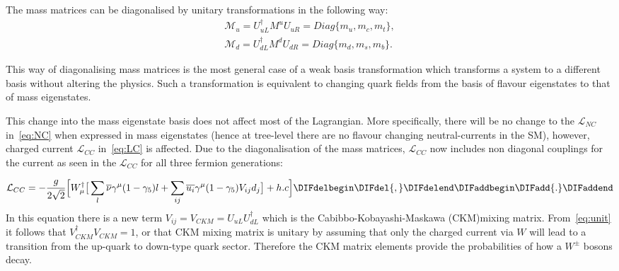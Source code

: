  \DIFaddend The mass matrices can be diagonalised by unitary transformations \DIFdelbegin {}\DIFdelend \DIFaddbegin {}\DIFaddend in the following way:
\begin{equation}
\begin{split}
	\mathcal{M}_{u} = U^{\dagger}_{uL}M^{u}U_{uR} = Diag\{m_{u},m_{c},m_{t}\},
\\
	\mathcal{M}_{d} = U^{\dagger}_{dL}M^{d}U_{dR} = Diag\{m_{d},m_{s},m_{b}\}.
\end{split}
	\label{eq:unit}
\end{equation}
\DIFdelbegin %

\DIFdelend This way of diagonalising mass matrices is the most general case of a weak basis transformation which transforms a system to a different basis without altering the physics. Such a transformation is equivalent to changing quark fields from the basis of flavour eigenstates to that of mass eigenstates.
%

This change into the mass eigenstate basis does not affect most of the Lagrangian. More specifically, there will be no change to the $\mathcal{L}_{NC}$ in~\autoref{eq:NC} when expressed in mass eigenstates (hence at tree-level there are no flavour changing neutral-currents in the \gls{SM}), however, \DIFaddbegin {}\DIFaddend charged current $\mathcal{L}_{CC}$ in~\autoref{eq:LC} is affected. Due to the diagonalisation of the mass matrices, $\mathcal{L}_{CC}$ now includes non diagonal couplings for the current as seen in the $\mathcal{L}_{CC}$ for all three fermion generations:

\begin{equation}
	\mathcal{L}_{CC}= - \frac{g}{2\sqrt{2}}\Big[W^{\dagger}_{\mu}\big[\sum_{l}\overline{\nu}\gamma^{\mu}(1-\gamma_{5})l + \sum_{ij}\overline{u_{i}}\gamma^{\mu}(1-\gamma_{5})V_{ij}d_{j}\big] + h.c\Big]\DIFdelbegin \DIFdel{, 
}\DIFdelend \DIFaddbegin \DIFadd{. 
}\DIFaddend \label{eq:LC}
\end{equation}
In this equation there is a new term $V_{ij}=V_{CKM}= U_{uL} U_{dL}^\dag$ which is the Cabibbo-Kobayashi-Maskawa (CKM)\DIFaddbegin {}\DIFaddend mixing matrix. From~\autoref{eq:unit} it follows that $V^{\dagger}_{CKM}V_{CKM}=1$, or that \gls{CKM} mixing matrix is unitary by assuming that only the charged current via $W$ will lead to a transition from the up-quark to down-type quark sector. Therefore the CKM matrix elements provide the probabilities of how a $W^{\pm}$ bosons decay.



